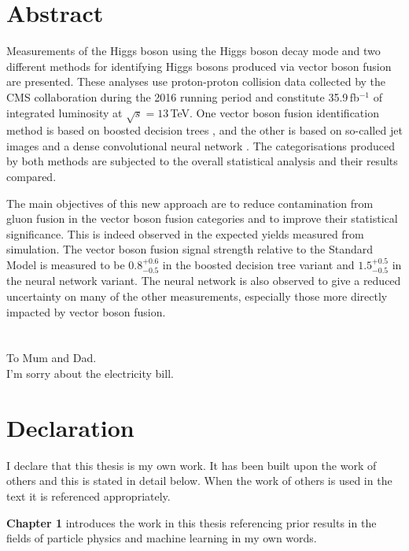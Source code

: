 

\chapter*{\centering Abstract}
Measurements of the Higgs boson using the \Hgg Higgs boson decay mode and two different methods for identifying Higgs bosons produced via vector boson fusion are presented.
These analyses use proton-proton collision data collected by the CMS collaboration during the 2016 running period and constitute 35.9\,fb$^{-1}$ of integrated luminosity at $\sqrt{s}=13$\,TeV.
One vector boson fusion identification method is based on boosted decision trees , and the other is based on so-called jet images and a dense convolutional neural network . The categorisations produced by both methods are subjected to the overall \Hgg statistical analysis and their results compared.

The main objectives of this new approach are to reduce contamination from gluon fusion in the vector boson fusion categories and to improve their statistical significance. 
This is indeed observed in the expected yields measured from simulation.
The vector boson fusion signal strength relative to the Standard Model is measured to be $0.8^{+0.6}_{-0.5}$ in the boosted decision tree variant and $1.5^{+0.5}_{-0.5}$ in the neural network variant. 
The neural network is also observed to give a reduced uncertainty on many of the other measurements, especially those more directly impacted by vector boson fusion.


\chapter*{\centering }%
\begin{center}
    \thispagestyle{empty}
    To Mum and Dad. \\
    I'm sorry about the electricity bill.
\end{center}

\chapter*{\centering Declaration}
I declare that this thesis is my own work. It has been built upon the work of others and this is stated in detail below. 
When the work of others is used in the text it is referenced appropriately.

\textbf{Chapter 1} introduces the work in this thesis referencing prior results in the fields of particle physics and machine learning in my own words.

